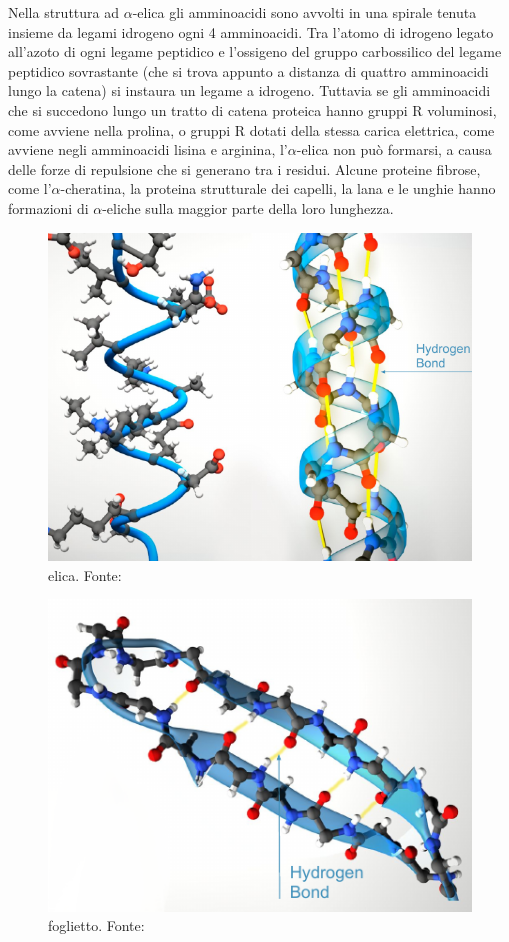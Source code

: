 \par Nella struttura ad $\alpha$-elica gli amminoacidi sono avvolti in una spirale tenuta insieme da legami idrogeno ogni 4 amminoacidi. Tra l’atomo di idrogeno legato all’azoto di ogni legame peptidico e l’ossigeno del gruppo carbossilico del legame peptidico sovrastante (che si trova appunto a distanza di quattro amminoacidi lungo la catena) si instaura un legame a idrogeno. Tuttavia se gli amminoacidi che si succedono lungo un tratto di catena proteica hanno gruppi R voluminosi, come avviene nella prolina, o gruppi R dotati della stessa carica elettrica, come avviene negli amminoacidi lisina e arginina, l’$\alpha$-elica non può formarsi, a causa delle forze di repulsione che si generano tra i residui. Alcune proteine fibrose, come l'$\alpha$-cheratina, la proteina strutturale dei capelli, la lana e le unghie hanno formazioni di $\alpha$-eliche sulla maggior parte della loro lunghezza.


\begin{figure}[!htp]
	\centering
	\includegraphics[scale=0.4]{images/alpha-helix.png}
	\caption{elica. Fonte: \cite{ProteinRCSB}}
	\label{fig:alpha-helix}
\end{figure}


\begin{figure}[!htp]
	\centering
	\includegraphics[scale=0.4]{images/beta-sheet.png}
	\caption{foglietto. Fonte: \cite{ProteinRCSB}}
	\label{fig:beta-sheet}
\end{figure}

